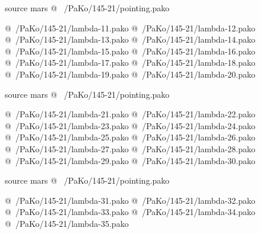 source mars
@ ~/PaKo/145-21/pointing.pako

@~/PaKo/145-21/lambda-11.pako
@~/PaKo/145-21/lambda-12.pako
@~/PaKo/145-21/lambda-13.pako
@~/PaKo/145-21/lambda-14.pako
@~/PaKo/145-21/lambda-15.pako
@~/PaKo/145-21/lambda-16.pako
@~/PaKo/145-21/lambda-17.pako
@~/PaKo/145-21/lambda-18.pako
@~/PaKo/145-21/lambda-19.pako
@~/PaKo/145-21/lambda-20.pako

source mars
@ ~/PaKo/145-21/pointing.pako

@~/PaKo/145-21/lambda-21.pako
@~/PaKo/145-21/lambda-22.pako
@~/PaKo/145-21/lambda-23.pako
@~/PaKo/145-21/lambda-24.pako
@~/PaKo/145-21/lambda-25.pako
@~/PaKo/145-21/lambda-26.pako
@~/PaKo/145-21/lambda-27.pako
@~/PaKo/145-21/lambda-28.pako
@~/PaKo/145-21/lambda-29.pako
@~/PaKo/145-21/lambda-30.pako

source mars
@ ~/PaKo/145-21/pointing.pako

@~/PaKo/145-21/lambda-31.pako
@~/PaKo/145-21/lambda-32.pako
@~/PaKo/145-21/lambda-33.pako
@~/PaKo/145-21/lambda-34.pako
@~/PaKo/145-21/lambda-35.pako

